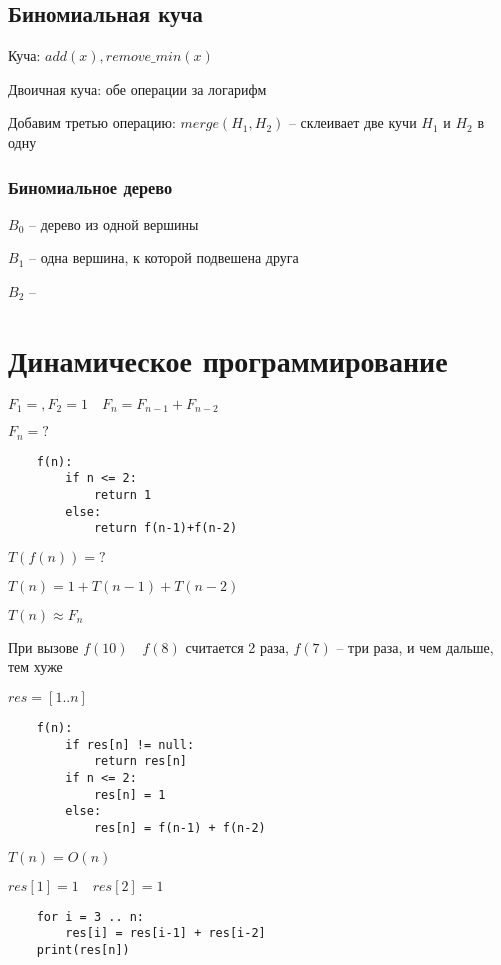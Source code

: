 \documentclass{book}
\theoremstyle{definition}
\newcommand{\incfig}[1]{%
    \def\svgwidth{\columnwidth}
    {#1.pdf_tex}
}
\begin{document}
\subsection{Биномиальная куча}

Куча: $add(x), remove\_min(x)$

Двоичная куча: обе операции за логарифм

Добавим третью операцию:  $merge(H_1, H_2)$ -- склеивает две кучи  $H_1$ и $H_2$  в одну

\subsubsection{Биномиальное дерево}

$B_0$ -- дерево из одной вершины

$B_1$ -- одна вершина, к которой подвешена друга

$B_2$ --
%

\section{Динамическое программирование}

$F_1 = , F_2=1\quad F_n = F_{n-1} + F_{n-2}$

$F_n = ?$

 \begin{verbatim}
    f(n):
        if n <= 2:
            return 1
        else:
            return f(n-1)+f(n-2)
\end{verbatim}

$T(f(n)) = ?$

$T(n) = 1+T(n-1)+T(n-2)$

$T(n)\approx F_n$

При вызове  $f(10)\quad f(8)$ считается 2 раза,  $f(7)$ -- три раза, и чем дальше, тем хуже

$res = [1..n]$

\begin{verbatim}
    f(n):
        if res[n] != null:
            return res[n]
        if n <= 2:
            res[n] = 1
        else:
            res[n] = f(n-1) + f(n-2)
\end{verbatim}

$T(n) = O(n)$

$res[1]=1\quad res[2]=1$

 \begin{verbatim}
    for i = 3 .. n:
        res[i] = res[i-1] + res[i-2]
    print(res[n])
\end{verbatim}
\end{document}
